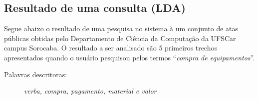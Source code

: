 \newpage

\subsection*{Resultado de uma consulta (LDA)}

Segue abaixo o resultado de uma pesquisa no sistema à um conjunto de atas públicas obtidas pelo Departamento de Ciência da Computação da UFSCar campus Sorocaba. O resultado a ser analisado são 5 primeiros trechos apresentados quando o usuário pesquisou pelos termos ``\textit{compra de equipamentos}''.

\vspace{0.5 cm}

\begin{description}
	\item[Palavras descritoras: ] \textit{verba, compra, pagamento, material e valor}
\end{description}



